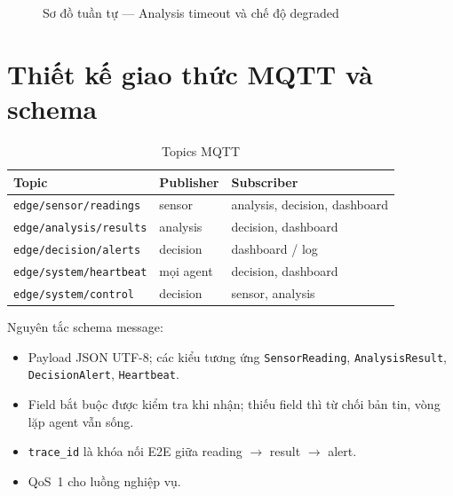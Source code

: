 \documentclass[12pt,a4paper,oneside]{report}
\newcommand{\code}[1]{\texttt{#1}}
\begin{document}
\begin{figure}[htbp]
  \centering
  \caption{Sơ đồ tuần tự --- Analysis timeout và chế độ degraded}
  \label{fig:seq-fault}
\end{figure}

\section{Thiết kế giao thức MQTT và schema}

\begin{table}[htbp]
  \centering
  \caption{Topics MQTT}
  \label{tab:topics}
  \begin{tabular}{lll}
    \toprule
    \textbf{Topic} & \textbf{Publisher} & \textbf{Subscriber} \\
    \midrule
    \code{edge/sensor/readings} & sensor & analysis, decision, dashboard \\
    \code{edge/analysis/results} & analysis & decision, dashboard \\
    \code{edge/decision/alerts} & decision & dashboard / log \\
    \code{edge/system/heartbeat} & mọi agent & decision, dashboard \\
    \code{edge/system/control} & decision & sensor, analysis \\
    \bottomrule
  \end{tabular}
\end{table}

Nguyên tắc schema message:
\begin{itemize}
  \item Payload JSON UTF-8; các kiểu tương ứng \code{SensorReading}, \code{AnalysisResult}, \code{DecisionAlert}, \code{Heartbeat}.
  \item Field bắt buộc được kiểm tra khi nhận; thiếu field thì từ chối bản tin, vòng lặp agent vẫn sống.
  \item \code{trace\_id} là khóa nối E2E giữa reading $\rightarrow$ result $\rightarrow$ alert.
  \item QoS~1 cho luồng nghiệp vụ.
\end{itemize}
\end{document}

